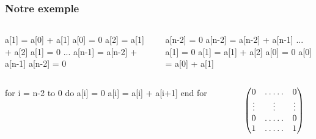 \documentclass[10pt]{beamer}
\begin{document}
\begin{frame}[fragile]
  \frametitle{Notre exemple}

  \begin{columns}
    \begin{column}{0.5\textwidth}
      \begin{center}
        \begin{minipage}{0.7\textwidth}
\begin{semiverbatim}
  a[1] = a[0] + a[1]
  a[0] = 0
  a[2] = a[1] + a[2]
  a[1] = 0
  ...
  a[n-1] = a[n-2] + a[n-1]
  a[n-2] = 0
\end{semiverbatim}
        \end{minipage}
      \end{center}
    \end{column}

    \begin{column}{0.5\textwidth}
      \begin{center}
        \begin{minipage}{0.7\textwidth}
\begin{semiverbatim}
  a[n-2] = 0
  a[n-2] = a[n-2] + a[n-1]
  ...
  a[1] = 0
  a[1] = a[1] + a[2]
  a[0] = 0
  a[0] = a[0] + a[1]
\end{semiverbatim}
        \end{minipage}
      \end{center}
    \end{column}
    \end{columns}
  
  \vfill
  \pause

  \begin{columns}

    \begin{column}{0.5\textwidth}
      \begin{center}
        \begin{minipage}{0.7\textwidth}
\begin{semiverbatim}
  for i = n-2 to 0 do
    a[i] = 0
    a[i] = a[i] + a[i+1]
  end for
\end{semiverbatim}
        \end{minipage}
      \end{center}
    \end{column}

    \begin{column}{0.5\textwidth}

      \begin{equation*}
        \begin{pmatrix}
          0 & \hdotsfor{3} & 0\\
          \vdots  &  &\vdots&& \vdots \\
          0 & \hdotsfor{3} & 0\\
          1 & \hdotsfor{3} & 1
        \end{pmatrix}
      \end{equation*}

    \end{column}
  \end{columns}
\end{frame}
\end{document}
